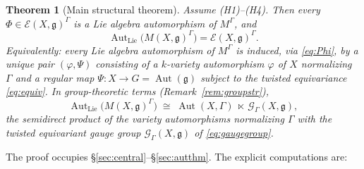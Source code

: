 \documentclass{amsart}
\newtheorem{theorem}{Theorem}
\theoremstyle{definition}
\DeclareMathOperator{\Aut}{Aut}
\newcommand{\g}{\mathfrak{g}}
\newcommand{\M}{M}
\begin{document}
\begin{theorem}[Main structural theorem]\label{thm:main}
Assume \textnormal{(H1)--(H4)}.  Then every $\Phi\in\mathcal{E}(X,\g)^\Gamma$
is a Lie algebra automorphism of $\M^\Gamma$, and
\[
\Aut_{\mathrm{Lie}}\bigl(\M(X,\g)^\Gamma\bigr)
=\mathcal{E}(X,\g)^\Gamma .
\]
Equivalently: every Lie algebra automorphism of $\M^\Gamma$ is induced,
via \eqref{eq:Phi}, by a unique pair $(\varphi,\Psi)$ consisting of a
$k$-variety automorphism $\varphi$ of $X$ normalizing $\Gamma$ and a
regular map $\Psi\colon X\to G=\Aut(\g)$ subject to the twisted
equivariance \eqref{eq:equiv}.  In group-theoretic terms (Remark~\ref{rem:groupstr}),
\[
\Aut_{\mathrm{Lie}}\bigl(\M(X,\g)^\Gamma\bigr)\;\cong\;
\Aut(X,\Gamma)\ \ltimes\ \mathcal G_\Gamma(X,\g),
\]
the semidirect product of the variety automorphisms normalizing $\Gamma$
with the twisted equivariant gauge group $\mathcal G_\Gamma(X,\g)$ of
\eqref{eq:gaugegroup}.
\end{theorem}

The proof occupies \S\ref{sec:central}--\S\ref{sec:autthm}.  The
explicit computations are:
\end{document}
